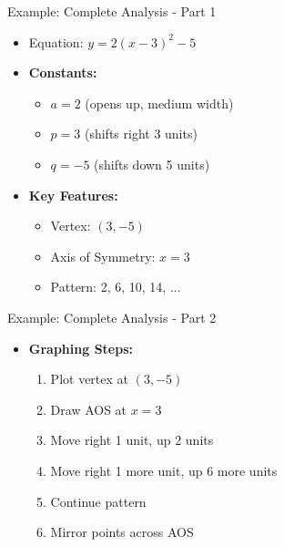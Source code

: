 \documentclass[aspectratio=169]{beamer}
\begin{document}
\begin{frame}{Example: Complete Analysis - Part 1}
    \begin{tcolorbox}[colback=lightgray,colframe=primary,title=Example: y]
        \footnotesize
        \begin{itemize}
            \item Equation: $y = 2(x-3)^2 - 5$
            \item \textbf{Constants:}
                \begin{itemize}
                    \item $a = 2$ (opens up, medium width)
                    \item $p = 3$ (shifts right 3 units)
                    \item $q = -5$ (shifts down 5 units)
                \end{itemize}
            \item \textbf{Key Features:}
                \begin{itemize}
                    \item Vertex: $(3,-5)$
                    \item Axis of Symmetry: $x = 3$
                    \item Pattern: 2, 6, 10, 14, ...
                \end{itemize}
        \end{itemize}
    \end{tcolorbox}
\end{frame}

\begin{frame}{Example: Complete Analysis - Part 2}
    \begin{tcolorbox}[colback=lightgray,colframe=primary,title=Example: $y = 2(x-3)^2 - 5$ (Graphing)]
        \footnotesize
        \begin{itemize}
            \item \textbf{Graphing Steps:}
                \begin{enumerate}
                    \item Plot vertex at $(3,-5)$
                    \item Draw AOS at $x = 3$
                    \item Move right 1 unit, up 2 units
                    \item Move right 1 more unit, up 6 more units
                    \item Continue pattern
                    \item Mirror points across AOS
                \end{enumerate}
        \end{itemize}
    \end{tcolorbox}
\end{frame}
\end{document}
